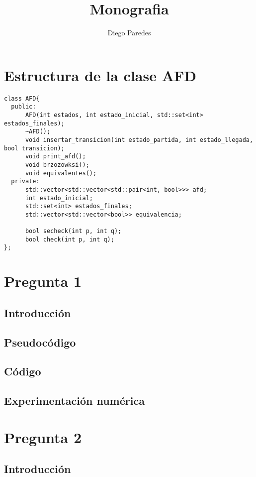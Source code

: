 \documentclass[12pt]{article}
\begin{document}
\title{Monografia}
\author{Diego Paredes}
\maketitle

\tableofcontents

\section{Estructura de la clase AFD}

\lstset{language=C++}
\begin{lstlisting}
class AFD{
  public:
      AFD(int estados, int estado_inicial, std::set<int> estados_finales);
      ~AFD();
      void insertar_transicion(int estado_partida, int estado_llegada, bool transicion);
      void print_afd();
      void brzozowksi();
      void equivalentes();
  private:
      std::vector<std::vector<std::pair<int, bool>>> afd;
      int estado_inicial;
      std::set<int> estados_finales;
      std::vector<std::vector<bool>> equivalencia;
      
      bool secheck(int p, int q);
      bool check(int p, int q);
};

\end{lstlisting}

\section{Pregunta 1}
\subsection{Introducción}
\subsection{Pseudocódigo}
\subsection{Código}
\subsection{Experimentación numérica}

\section{Pregunta 2}
\subsection{Introducción}
\end{document}
